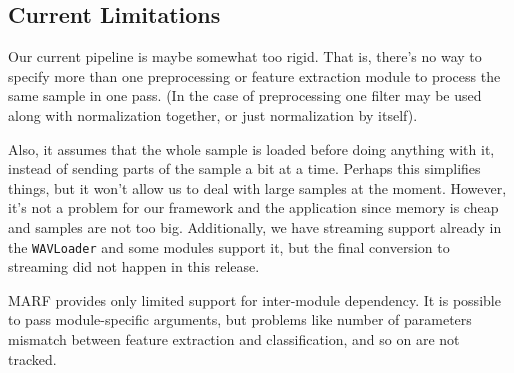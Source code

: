 \subsection{Current Limitations}

Our current pipeline is maybe somewhat too
rigid.  That is, there's no way to specify more than one preprocessing
or feature extraction module to process the same sample in one pass.
(In the case of preprocessing one filter may be used
along with normalization together, or just normalization by itself).

Also, it assumes that the whole sample is loaded before doing
anything with it, instead of sending parts of the sample a bit at a time.
Perhaps this simplifies things, but it won't allow us to deal with large
samples at the moment. However, it's not a problem for our framework
and the application since memory is cheap and samples are not too big. Additionally,
we have streaming support already in the \verb+WAVLoader+ and some modules support it, but
the final conversion to streaming did not happen in this release.

MARF provides only limited support for inter-module dependency. It is possible
to pass module-specific arguments, but problems like
number of parameters mismatch between feature extraction and classification,
and so on are not tracked.
